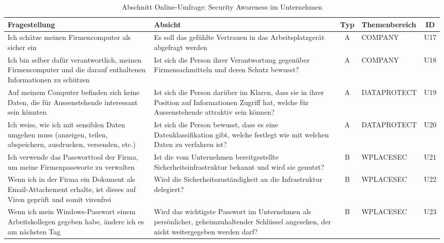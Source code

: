 \documentclass[../../main.tex]{subfiles}
\begin{document}
\begin{table}[H]
\tablefontsize	
\centering
\caption{Abschnitt Online-Umfrage: Security Awareness im Unternehmen}
\label{Security Awareness im Unternehmen}
\begin{tabular}{ |p{5.5cm}|p{5.5cm}|c|p{2.5cm}|c|}

\hline
\tableheaderbgcolor
\textbf{Fragestellung} & \textbf{Absicht} & \textbf{Typ} & \textbf{Themenbereich} & \textbf{ID}\\ 
\hline
Ich schätze meinen Firmencomputer als sicher ein & Es soll das gefühlte Vertrauen in das Arbeitsplatzgerät abgefragt werden & A & COMPANY & U17 \\
\hline

Ich bin selber dafür verantwortlich, meinen Firmencomputer und die darauf enthaltenen Informationen zu schützen & Ist sich die Person ihrer Verantwortung gegenüber Firmensachmitteln und deren Schutz bewusst? & A & COMPANY & U18 \\
\hline

Auf meinem Computer befinden sich keine Daten, die für Aussenstehende interessant sein könnten & Ist sich die Person darüber im Klaren, dass sie in ihrer Position auf Informationen Zugriff hat, welche für Aussenstehende attraktiv sein können? & A & DATAPROTECT & U19 \\
\hline

Ich weiss, wie ich mit sensiblen Daten umgehen muss (anzeigen, teilen, abspeichern, ausdrucken, versenden, etc.) & Ist sich die Person bewusst, dass es eine Datenklassifikation gibt, welche festlegt wie mit welchen Daten zu verfahren ist? & A & DATAPROTECT & U20 \\
\hline

Ich verwende das Passworttool der Firma, um meine Firmenpassworte zu verwalten & Ist die vom Unternehmen bereitgestellte Sicherheitsinfrastruktur bekannt und wird sie genutzt? & B & WPLACESEC & U21 \\
\hline

Wenn ich in der Firma ein Dokument als Email-Attachement erhalte, ist dieses auf Viren geprüft und somit virenfrei & Wird die Sicherheitszuständigkeit an die Infrastruktur delegiert? & B & WPLACESEC & U22 \\
\hline

Wenn ich mein Windows-Passwort einem Arbeitskollegen gegeben habe, ändere ich es am nächsten Tag & Wird das wichtigste Passwort im Unternehmen als persönlicher, geheimzuhaltender Schlüssel angesehen, der nicht weitergegeben werden darf? & B & WPLACESEC & U23 \\
\hline


\end{tabular}
\end{table}
\end{document}
